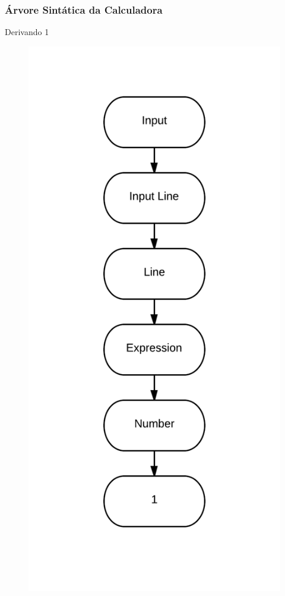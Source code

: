 \documentclass{beamer}
\begin{document}
\begin {frame}
\frametitle{Árvore Sintática da Calculadora }
Derivando 1

\begin{figure} 	%
            \centering		%
            \includegraphics[scale=0.12]{1.png} %
            \end{figure} 

\end{frame}
\end{document}
